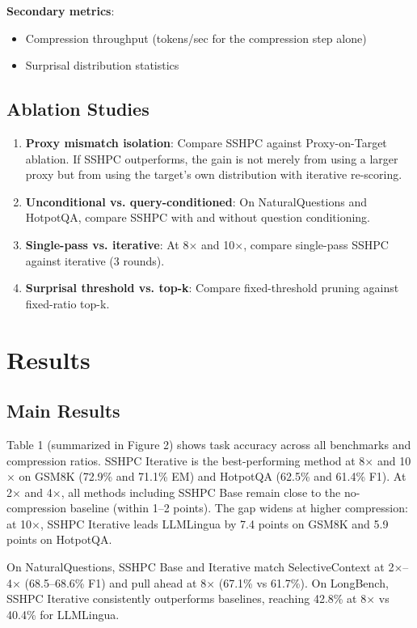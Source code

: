 \documentclass[11pt,letterpaper]{article}
\begin{document}
\textbf{Secondary metrics}:
\begin{itemize}
  \item Compression throughput (tokens/sec for the compression step alone)
  \item Surprisal distribution statistics
\end{itemize}

\subsection{Ablation Studies}

\begin{enumerate}
  \item \textbf{Proxy mismatch isolation}: Compare SSHPC against Proxy-on-Target ablation. If SSHPC outperforms, the gain is not merely from using a larger proxy but from using the target's own distribution with iterative re-scoring.
  \item \textbf{Unconditional vs. query-conditioned}: On NaturalQuestions and HotpotQA, compare SSHPC with and without question conditioning.
  \item \textbf{Single-pass vs. iterative}: At 8$\times$ and 10$\times$, compare single-pass SSHPC against iterative (3 rounds).
  \item \textbf{Surprisal threshold vs. top-k}: Compare fixed-threshold pruning against fixed-ratio top-k.
\end{enumerate}

\section{Results}

\subsection{Main Results}

Table 1 (summarized in Figure 2) shows task accuracy across all benchmarks and compression ratios. SSHPC Iterative is the best-performing method at 8$\times$ and 10$\times$ on GSM8K (72.9\% and 71.1\% EM) and HotpotQA (62.5\% and 61.4\% F1). At 2$\times$ and 4$\times$, all methods including SSHPC Base remain close to the no-compression baseline (within 1--2 points). The gap widens at higher compression: at 10$\times$, SSHPC Iterative leads LLMLingua by 7.4 points on GSM8K and 5.9 points on HotpotQA.

On NaturalQuestions, SSHPC Base and Iterative match SelectiveContext at 2$\times$--4$\times$ (68.5--68.6\% F1) and pull ahead at 8$\times$ (67.1\% vs 61.7\%). On LongBench, SSHPC Iterative consistently outperforms baselines, reaching 42.8\% at 8$\times$ vs 40.4\% for LLMLingua.
\end{document}
